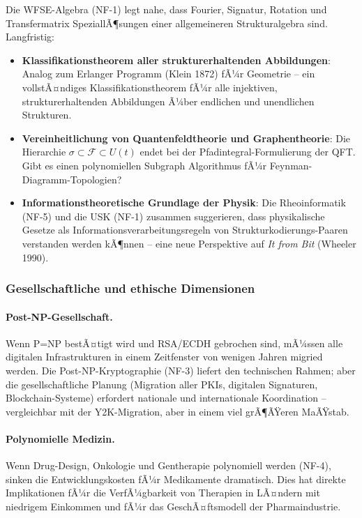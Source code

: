 ﻿\documentclass[a4paper,12pt]{scrreprt}
\theoremstyle{definition}
\begin{document}
Die WFSE-Algebra (NF-1) legt nahe, dass Fourier, Signatur, Rotation
und Transfermatrix SpeziallÃ¶sungen einer allgemeineren Strukturalgebra
sind. Langfristig:
\begin{itemize}
  \item \textbf{Klassifikationstheorem aller strukturerhaltenden
    Abbildungen}: Analog zum Erlanger Programm (Klein 1872) fÃ¼r
    Geometrie -- ein vollstÃ¤ndiges Klassifikationstheorem fÃ¼r alle
    injektiven, strukturerhaltenden Abbildungen Ã¼ber endlichen
    und unendlichen Strukturen.
  \item \textbf{Vereinheitlichung von Quantenfeldtheorie und
    Graphentheorie}: Die Hierarchie
    $\sigma \subset \mathcal{F} \subset U(t)$ endet bei der
    Pfadintegral-Formulierung der QFT. Gibt es einen
    polynomiellen Subgraph Algorithmus fÃ¼r
    Feynman-Diagramm-Topologien?
  \item \textbf{Informationstheoretische Grundlage der Physik}:
    Die Rheoinformatik (NF-5) und die USK (NF-1) zusammen suggerieren,
    dass physikalische Gesetze als Informationsverarbeitungsregeln
    von Strukturkodierungs-Paaren verstanden werden kÃ¶nnen --
    eine neue Perspektive auf \emph{It from Bit} (Wheeler 1990).
\end{itemize}

\subsubsection{Gesellschaftliche und ethische Dimensionen}

\paragraph{Post-NP-Gesellschaft.}
Wenn P=NP bestÃ¤tigt wird und RSA/ECDH gebrochen sind, mÃ¼ssen alle
digitalen Infrastrukturen in einem Zeitfenster von wenigen Jahren
migried werden. Die Post-NP-Kryptographie (NF-3) liefert den
technischen Rahmen; aber die gesellschaftliche Planung (Migration
aller PKIs, digitalen Signaturen, Blockchain-Systeme) erfordert
nationale und internationale Koordination -- vergleichbar mit
der Y2K-Migration, aber in einem viel grÃ¶ÃŸeren MaÃŸstab.

\paragraph{Polynomielle Medizin.}
Wenn Drug-Design, Onkologie und Gentherapie polynomiell werden (NF-4),
sinken die Entwicklungskosten fÃ¼r Medikamente dramatisch. Dies hat
direkte Implikationen fÃ¼r die VerfÃ¼gbarkeit von Therapien
in LÃ¤ndern mit niedrigem Einkommen und fÃ¼r das GeschÃ¤ftsmodell
der Pharmaindustrie.
\end{document}
